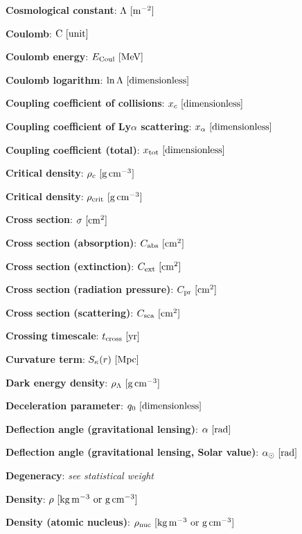 \documentclass[a4paper,10pt]{article}
\begin{document}
{\noindent}\textbf{Cosmological constant}: $\Lambda ~ [{\rm m^{-2}}]$

{\noindent}\textbf{Coulomb}: ${\rm C} ~ [{\rm unit}]$

{\noindent}\textbf{Coulomb energy}: $E_{\rm Coul} ~ [{\rm MeV}]$

{\noindent}\textbf{Coulomb logarithm}: $\ln\Lambda ~ [{\rm dimensionless}]$

{\noindent}\textbf{Coupling coefficient of collisions}: $x_c ~ [{\rm dimensionless}]$

{\noindent}\textbf{Coupling coefficient of Ly$\alpha$ scattering}: $x_\alpha ~ [{\rm dimensionless}]$

{\noindent}\textbf{Coupling coefficient (total)}: $x_\mathrm{tot} ~ [{\rm dimensionless}]$

{\noindent}\textbf{Critical density}: $\rho_c ~ [{\rm g\,cm^{-3}}]$

{\noindent}\textbf{Critical density}: $\rho_\mathrm{crit} ~ [{\rm g\,cm^{-3}}]$

{\noindent}\textbf{Cross section}: $\sigma ~ [{\rm cm^{2}}]$

{\noindent}\textbf{Cross section (absorption)}: $C_{\rm abs} ~ [{\rm cm^{2}}]$

{\noindent}\textbf{Cross section (extinction)}: $C_{\rm ext} ~ [{\rm cm^{2}}]$

{\noindent}\textbf{Cross section (radiation pressure)}: $C_{\rm pr} ~ [{\rm cm^{2}}]$

{\noindent}\textbf{Cross section (scattering)}: $C_{\rm sca} ~ [{\rm cm^{2}}]$

{\noindent}\textbf{Crossing timescale}: $t_\mathrm{cross} ~ [{\rm yr}]$

{\noindent}\textbf{Curvature term}: $S_\kappa(r) ~ [{\rm Mpc}]$

{\noindent}\textbf{Dark energy density}: $\rho_\Lambda ~ [{\rm g\,cm^{-3}}]$

{\noindent}\textbf{Deceleration parameter}: $q_0 ~ [{\rm dimensionless}]$

{\noindent}\textbf{Deflection angle (gravitational lensing)}: $\alpha ~ [{\rm rad}]$

{\noindent}\textbf{Deflection angle (gravitational lensing, Solar value)}: $\alpha_\odot ~ [{\rm rad}]$

{\noindent}\textbf{Degeneracy}: \textit{see statistical weight}

{\noindent}\textbf{Density}: $\rho ~ [{\rm kg\,m^{-3}~{\rm or}~g\,cm^{-3}}]$

{\noindent}\textbf{Density (atomic nucleus)}: $\rho_{\rm nuc} ~ [{\rm kg\,m^{-3}~{\rm or}~g\,cm^{-3}}]$
\end{document}
